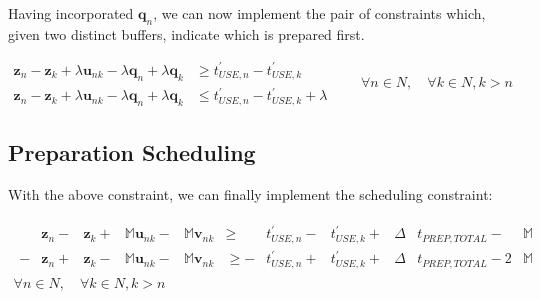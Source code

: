 Having incorporated $ \boldsymbol{q}_{n} $, we can now implement the pair of 
constraints which, given two distinct buffers, indicate which is prepared
first.

\begin{equation}
    \begin{split}
        \boldsymbol{z}_{n} - \boldsymbol{z}_{k} + \lambda \boldsymbol{u}_{nk}
        - \lambda \boldsymbol{q}_{n} + \lambda \boldsymbol{q}_{k} &\ge 
        t_{USE,n}^{\prime} - t_{USE,k}^{\prime}\\
        \boldsymbol{z}_{n} - \boldsymbol{z}_{k} + \lambda \boldsymbol{u}_{nk}
        - \lambda \boldsymbol{q}_{n} + \lambda \boldsymbol{q}_{k} &\le 
        t_{USE,n}^{\prime} - t_{USE,k}^{\prime} + \lambda
    \end{split}
    \quad \quad \forall n \in N, \quad \forall k \in N, k > n
\end{equation}

\subsection{Preparation Scheduling}\label{SS.constr9}

With the above constraint, we can finally implement the scheduling constraint:

\begin{equation}
    \begin{split}
        \begin{alignedat}{10}
        &\boldsymbol{z}_{n} {}-{} &\boldsymbol{z}_{k} {}+{} &\mathbb{M}
        \boldsymbol{u}_{nk} {}-{} &\mathbb{M} \boldsymbol{v}_{nk} &\ge
        &t_{USE,n}^{\prime} {}-{} &t_{USE,k}^{\prime} {}+{}
        &\Delta &t_{PREP,TOTAL} {}-{} &\mathbb{M}\\
        - &\boldsymbol{z}_{n} {}+{} &\boldsymbol{z}_{k} {}-{} &\mathbb{M}
        \boldsymbol{u}_{nk} {}-{} &\mathbb{M} \boldsymbol{v}_{nk} &\ge
        - &t_{USE,n}^{\prime} {}+{} &t_{USE,k}^{\prime} {}+{}
        &\Delta &t_{PREP,TOTAL} {}-{} 2 &\mathbb{M}
        \end{alignedat}
        \\\forall n \in N, \quad \forall k \in N, k > n
    \end{split}
\end{equation}


